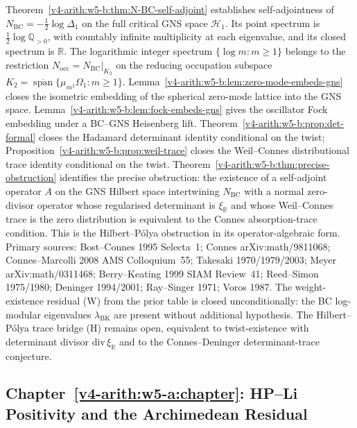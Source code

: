 Theorem~\ref{v4-arith:w5-b:thm:N-BC-self-adjoint} establishes self-adjointness
of \(N_{\mathrm{BC}}=-\tfrac12\log\Delta_1\) on the full critical GNS
space \(\mathcal H_1\). Its point spectrum is
\(\tfrac12\log\mathbb Q_{>0}\), with countably infinite multiplicity
at each eigenvalue, and its closed spectrum is \(\mathbb R\).
The logarithmic integer spectrum \(\{\log m:m\ge1\}\) belongs to
the restriction \(N_{\mathrm{occ}}=N_{\mathrm{BC}}|_{K_2}\) on the
reducing occupation subspace
\(K_2=\overline{\operatorname{span}}\{\mu_{m^2}\Omega_1:m\ge1\}\).
Lemma~\ref{v4-arith:w5-b:lem:zero-mode-embeds-gns}
closes the isometric embedding of the spherical zero-mode lattice into
the GNS space.  Lemma~\ref{v4-arith:w5-b:lem:fock-embeds-gns} gives the
oscillator Fock embedding under a BC--GNS Heisenberg lift.
Theorem~\ref{v4-arith:w5-b:prop:det-formal} closes the Hadamard determinant
identity conditional on the twist;
Proposition~\ref{v4-arith:w5-b:prop:weil-trace} closes the Weil--Connes
distributional trace identity conditional on the twist.
Theorem~\ref{v4-arith:w5-b:thm:precise-obstruction}
identifies the precise obstruction: the existence of a self-adjoint
operator \(A\) on the GNS Hilbert space intertwining \(N_{\mathrm{BC}}\)
with a normal zero-divisor operator whose regularised determinant is
\(\xi_{\mathbb R}\) and whose Weil--Connes trace is the zero
distribution is equivalent to the Connes absorption-trace condition.
This is the Hilbert--P\'{o}lya obstruction in its
operator-algebraic form.
Primary sources: Bost--Connes 1995 Selecta~1;
Connes arXiv:math/9811068; Connes--Marcolli 2008 AMS Colloquium~55;
Takesaki 1970/1979/2003; Meyer arXiv:math/0311468;
Berry--Keating 1999 SIAM Review~41; Reed--Simon 1975/1980;
Deninger 1994/2001; Ray--Singer 1971; Voros 1987.
The weight-existence residual (W) from the prior table is closed
unconditionally: the BC log-modular eigenvalues \(\lambda_{\mathrm{BK}}\)
are present without additional hypothesis.
The Hilbert--P\'{o}lya trace bridge (H) remains open, equivalent to
twist-existence with determinant divisor
\(\mathrm{div}\,\xi_{\mathbb R}\) and to the Connes--Deninger
determinant-trace conjecture.

\subsection{Chapter~\ref{v4-arith:w5-a:chapter}: HP--Li Positivity and the Archimedean Residual}
\label{v4-arith:w5-synth:ch57}

